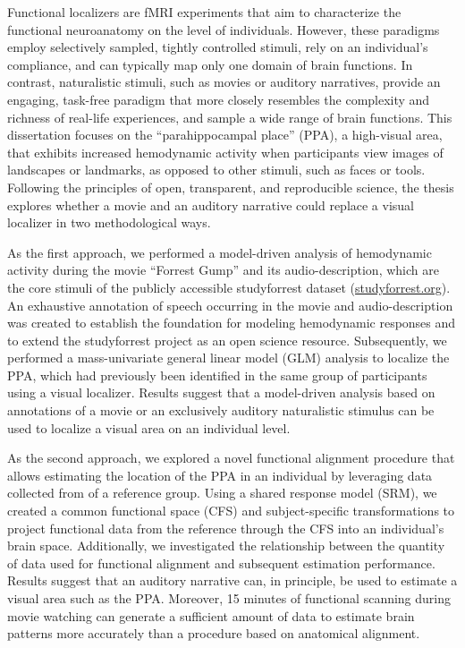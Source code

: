 
Functional localizers are fMRI experiments that aim to characterize the
functional neuroanatomy on the level of individuals.
%
However, these paradigms employ selectively sampled, tightly controlled
stimuli, rely on an individual's compliance, and can typically map only one
domain of brain functions.
In contrast, naturalistic stimuli, such as movies or auditory narratives,
provide an engaging, task-free paradigm that more closely resembles the
complexity and richness of real-life experiences, and sample a wide range of
brain functions.
This dissertation focuses on the ``parahippocampal place'' (PPA), a high-visual
area, that exhibits increased hemodynamic activity when participants view
images of landscapes or landmarks, as opposed to other stimuli, such as faces
or tools.
Following the principles of open, transparent, and reproducible science, the
thesis explores whether a movie and an auditory narrative could replace a
visual localizer in two methodological ways.

As the first approach, we performed a model-driven analysis of hemodynamic
activity during the movie ``Forrest Gump'' and its audio-description, which are
the core stimuli of the publicly accessible studyforrest dataset
(\href{www.studyforrest.org}{\url{studyforrest.org}}).
%
An exhaustive annotation of speech occurring in the movie and audio-description
was created to establish the foundation for modeling hemodynamic responses and
to extend the studyforrest project as an open science resource.
Subsequently, we performed a mass-univariate general linear model (GLM)
analysis to localize the PPA, which had previously been identified in the same
group of participants using a visual localizer.
Results suggest that a model-driven analysis based on annotations of a movie or
an exclusively auditory naturalistic stimulus can be used to localize a visual
area on an individual level.

As the second approach, we explored a novel functional alignment procedure that
allows estimating the location of the PPA in an individual by leveraging data
collected from of a reference group.
%
Using a shared response model (SRM), we created a common functional space (CFS)
and subject-specific transformations to project functional data from the
reference through the CFS into an individual's brain space.
%
Additionally, we investigated the relationship between the quantity of data
used for functional alignment and subsequent estimation performance.
%
Results suggest that an auditory narrative can, in principle, be used to
estimate a visual area such as the PPA.
%
Moreover, 15 minutes of functional scanning during movie watching can generate
a sufficient amount of data to estimate brain patterns more accurately than a
procedure based on anatomical alignment.

